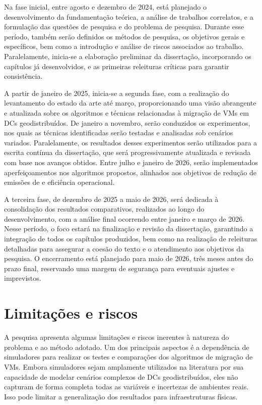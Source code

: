 \documentclass[
	12pt,				%
	oneside,			%
	a4paper,			%
	english,			%
	brazil				%
	]{abntex2ppgsi}
\begin{document}
Na fase inicial, entre agosto e dezembro de 2024, está planejado o desenvolvimento da fundamentação teórica, a análise de trabalhos correlatos, e a formulação das questões de pesquisa e do problema de pesquisa. Durante esse período, também serão definidos os métodos de pesquisa, os objetivos gerais e específicos, bem como a introdução e análise de riscos associados ao trabalho. Paralelamente, inicia-se a elaboração preliminar da dissertação, incorporando os capítulos já desenvolvidos, e as primeiras releituras críticas para garantir consistência.

A partir de janeiro de 2025, inicia-se a segunda fase, com a realização do levantamento do estado da arte até março, proporcionando uma visão abrangente e atualizada sobre os algoritmos e técnicas relacionadas à migração de VMs em DCs geodistribuídos. De janeiro a novembro, serão conduzidos os experimentos, nos quais as técnicas identificadas serão testadas e analisadas sob cenários variados. Paralelamente, os resultados desses experimentos serão utilizados para a escrita contínua da dissertação, que será progressivamente atualizada e revisada com base nos avanços obtidos. Entre julho e janeiro de 2026, serão implementados aperfeiçoamentos nos algoritmos propostos, alinhados aos objetivos de redução de emissões de  e eficiência operacional.

A terceira fase, de dezembro de 2025 a maio de 2026, será dedicada à consolidação dos resultados comparativos, realizados ao longo do desenvolvimento, com a análise final ocorrendo entre janeiro e março de 2026. Nesse período, o foco estará na finalização e revisão da dissertação, garantindo a integração de todos os capítulos produzidos, bem como na realização de releituras detalhadas para assegurar a coesão do texto e o atendimento aos objetivos da pesquisa. O encerramento está planejado para maio de 2026, três meses antes do prazo final, reservando uma margem de segurança para eventuais ajustes e imprevistos.

\section{Limitações e riscos}
A pesquisa apresenta algumas limitações e riscos inerentes à natureza do problema e ao método adotado. Um dos principais aspectos é a dependência de simuladores para realizar os testes e comparações dos algoritmos de migração de VMs. Embora simuladores sejam amplamente utilizados na literatura por sua capacidade de modelar cenários complexos de DCs geodistribuídos, eles não capturam de forma completa todas as variáveis e incertezas de ambientes reais. Isso pode limitar a generalização dos resultados para infraestruturas físicas.
\end{document}
